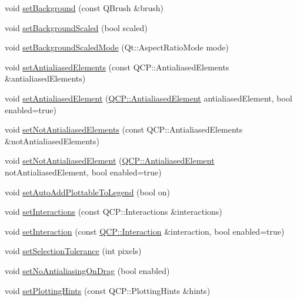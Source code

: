 \begin{DoxyCompactItemize}
\item 
void \hyperlink{class_q_custom_plot_a8ed256cf467bfa7ba1f9feaae62c3bd0}{set\+Background} (const Q\+Brush \&brush)
\item 
void \hyperlink{class_q_custom_plot_a36f0fa1317325dc7b7efea615ee2de1f}{set\+Background\+Scaled} (bool scaled)
\item 
void \hyperlink{class_q_custom_plot_a4c0eb4865b7949f62e1cb97db04a3de0}{set\+Background\+Scaled\+Mode} (Qt\+::\+Aspect\+Ratio\+Mode mode)
\item 
void \hyperlink{class_q_custom_plot_af6f91e5eab1be85f67c556e98c3745e8}{set\+Antialiased\+Elements} (const Q\+C\+P\+::\+Antialiased\+Elements \&antialiased\+Elements)
\item 
void \hyperlink{class_q_custom_plot_aeef813bcf7efab8e765f9f87ec454691}{set\+Antialiased\+Element} (\hyperlink{namespace_q_c_p_ae55dbe315d41fe80f29ba88100843a0c}{Q\+C\+P\+::\+Antialiased\+Element} antialiased\+Element, bool enabled=true)
\item 
void \hyperlink{class_q_custom_plot_ae10d685b5eabea2999fb8775ca173c24}{set\+Not\+Antialiased\+Elements} (const Q\+C\+P\+::\+Antialiased\+Elements \&not\+Antialiased\+Elements)
\item 
void \hyperlink{class_q_custom_plot_afc657938a707c890e449ae89203a076d}{set\+Not\+Antialiased\+Element} (\hyperlink{namespace_q_c_p_ae55dbe315d41fe80f29ba88100843a0c}{Q\+C\+P\+::\+Antialiased\+Element} not\+Antialiased\+Element, bool enabled=true)
\item 
void \hyperlink{class_q_custom_plot_ad8858410c2db47b7104040a3aa61c3fc}{set\+Auto\+Add\+Plottable\+To\+Legend} (bool on)
\item 
void \hyperlink{class_q_custom_plot_a5ee1e2f6ae27419deca53e75907c27e5}{set\+Interactions} (const Q\+C\+P\+::\+Interactions \&interactions)
\item 
void \hyperlink{class_q_custom_plot_a422bf1bc6d56dac75a3d805d9a65902c}{set\+Interaction} (const \hyperlink{namespace_q_c_p_a2ad6bb6281c7c2d593d4277b44c2b037}{Q\+C\+P\+::\+Interaction} \&interaction, bool enabled=true)
\item 
void \hyperlink{class_q_custom_plot_a4dc31241d7b09680950e19e5f971ed93}{set\+Selection\+Tolerance} (int pixels)
\item 
void \hyperlink{class_q_custom_plot_a775bdcb6329d44701aeaa6135b0e5265}{set\+No\+Antialiasing\+On\+Drag} (bool enabled)
\item 
void \hyperlink{class_q_custom_plot_a94a33cbdadbbac5934843508bcfc210d}{set\+Plotting\+Hints} (const Q\+C\+P\+::\+Plotting\+Hints \&hints)

\end{DoxyCompactItemize}
